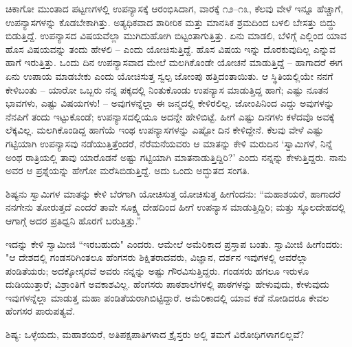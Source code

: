 ಚಿಕಾಗೋ ಮುಂತಾದ ಪಟ್ಟಣಗಳಲ್ಲಿ ಉಪನ್ಯಾಸಕ್ಕೆ ಆರಂಭಿಸಿದಾಗ, ವಾರಕ್ಕೆ ೧೨–೧೩, ಕೆಲವು ವೇಳೆ ಇನ್ನೂ ಹೆಚ್ಚಾಗೆ, ಉಪನ್ಯಾಸಗಳನ್ನು ಕೊಡಬೇಕಾಗಿತ್ತು. ಅತ್ಯಧಿಕವಾದ ಶಾರೀರಿಕ ಮತ್ತು ಮಾನಸಿಕ ಶ್ರಮದಿಂದ ಬಳಲಿ ಬೇಸತ್ತು ಬಿದ್ದು ಬಿಡುತ್ತಿದ್ದೆ. ಉಪನ್ಯಾಸದ ವಿಷಯವೆಲ್ಲಾ ಮುಗಿದುಹೋಗಿ ಬಿಟ್ಟಂತಾಗುತ್ತಿತ್ತು. ಏನು ಮಾಡಲಿ, ಬೆಳಿಗ್ಗೆ ಎಲ್ಲಿಂದ ಯಾವ ಹೊಸ ವಿಷಯವನ್ನು ತಂದು ಹೇಳಲಿ – ಎಂದು ಯೋಚಿಸುತ್ತಿದ್ದೆ. ಹೊಸ ವಿಷಯ ಇನ್ನು ದೊರಕುವುದಿಲ್ಲ ಎನ್ನುವ ಹಾಗೆ ಇರುತ್ತಿತ್ತು. ಒಂದು ದಿನ ಉಪನ್ಯಾಸವಾದ ಮೇಲೆ ಮಲಗಿಕೊಂಡೇ ಯೋಚನೆ ಮಾಡುತ್ತಿದ್ದೆ – ಹಾಗಾದರೆ ಈಗ ಏನು ಉಪಾಯ ಮಾಡಬೇಕು ಎಂದು ಯೋಚಿಸುತ್ತ ಸ್ವಲ್ಪ ಜೋಂಪು ಹತ್ತಿದಂತಾಯಿತು. ಆ ಸ್ಥಿತಿಯಲ್ಲಿಯೇ ನನಗೆ ಕೇಳಿಬಂತು – ಯಾರೋ ಒಬ್ಬರು ನನ್ನ ಪಕ್ಕದಲ್ಲಿ ನಿಂತುಕೊಂಡು ಉಪನ್ಯಾಸ ಮಾಡುತ್ತಿದ್ದ ಹಾಗೆ; ಎಷ್ಟು ನೂತನ ಭಾವಗಳು, ಎಷ್ಟು ವಿಷಯಗಳು! – ಅವುಗಳನ್ನೆಲ್ಲಾ ಈ ಜನ್ಮದಲ್ಲಿ ಕೇಳಿರಲಿಲ್ಲ. ಜೋಂಪಿನಿಂದ ಎದ್ದು ಅವುಗಳನ್ನು ನೆನಪಿಗೆ ತಂದು ಇಟ್ಟುಕೊಂಡೆ; ಉಪನ್ಯಾಸದಲ್ಲಿಯೂ ಅದನ್ನೇ ಹೇಳಿಬಿಟ್ಟೆ. ಹೀಗೆ ಎಷ್ಟು ದಿನಗಳು ಕಳೆದವೊ ಅವಕ್ಕೆ ಲೆಕ್ಕವಿಲ್ಲ. ಮಲಗಿಕೊಂಡಿದ್ದ ಹಾಗೆಯೆ ಇಂಥ ಉಪನ್ಯಾಸಗಳನ್ನು ಎಷ್ಟೋ ದಿನ ಕೇಳಿದ್ದೇನೆ. ಕೆಲವು ವೇಳೆ ಎಷ್ಟು ಗಟ್ಟಿಯಾಗಿ ಉಪನ್ಯಾಸವು ನಡೆಯುತ್ತಿತ್ತೆಂದರೆ, ನೆರೆಮನೆಯವರು ಆ ಮಾತನ್ನು ಕೇಳಿ ಮರುದಿನ ‘ಸ್ವಾಮಿಗಳೆ, ನಿನ್ನೆ ಅಂಥ ರಾತ್ರಿಯಲ್ಲಿ ತಾವು ಯಾರೊಡನೆ ಅಷ್ಟು ಗಟ್ಟಿಯಾಗಿ ಮಾತನಾಡುತ್ತಿದ್ದಿರಿ?’ ಎಂದು ನನ್ನನ್ನು ಕೇಳುತ್ತಿದ್ದರು. ನಾನು ಅವರ ಆ ಪ್ರಶ್ನೆಯನ್ನು ಹೇಗೋ ಮರೆಸಿಬಿಡುತ್ತಿದ್ದೆ. ಅದು ಒಂದು ಅದ್ಭುತದ ಸಂಗತಿ.

ಶಿಷ್ಯನು ಸ್ವಾಮಿಗಳ ಮಾತನ್ನು ಕೇಳಿ ಬೆರಗಾಗಿ ಯೋಚಿಸುತ್ತ ಯೋಚಿಸುತ್ತ ಹೀಗೆಂದನು: “ಮಹಾಶಯರೆ, ಹಾಗಾದರೆ ನನಗೇನು ತೋರುತ್ತದೆ ಎಂದರೆ ತಾವೇ ಸೂಕ್ಷ್ಮ ದೇಹದಿಂದ ಹೀಗೆ ಉಪನ್ಯಾಸ ಮಾಡುತ್ತಿದ್ದಿರಿ; ಮತ್ತು ಸ್ಥೂಲದೇಹದಲ್ಲಿ ಆಗಾಗ್ಗೆ ಅದರ ಪ್ರತಿಧ್ವನಿ ಹೊರಗೆ ಬರುತ್ತಿತ್ತು.”

ಇದನ್ನು ಕೇಳಿ ಸ್ವಾಮೀಜಿ “ಇರಬಹುದು" ಎಂದರು. ಆಮೇಲೆ ಅಮೆರಿಕಾದ ಪ್ರಸ್ತಾಪ ಬಂತು. ಸ್ವಾಮೀಜಿ ಹೀಗೆಂದರು: "ಆ ದೇಶದಲ್ಲಿ ಗಂಡಸರಿಗಿಂತಲೂ ಹೆಂಗಸರು ಶಿಕ್ಷಿತರಾದವರು, ವಿಜ್ಞಾನ, ದರ್ಶನ ಇವುಗಳಲ್ಲಿ ಅವರೆಲ್ಲಾ ಪಂಡಿತೆಯರು; ಅದಕ್ಕೋಸ್ಕರವೆ ಅವರು ನನ್ನನ್ನು ಅಷ್ಟು ಗೌರವಿಸುತ್ತಿದ್ದರು. ಗಂಡಸರು ಹಗಲೂ ಇರುಳೂ ದುಡಿಯುತ್ತಾರೆ; ವಿಶ್ರಾಂತಿಗೆ ಅವಕಾಶವಿಲ್ಲ. ಹೆಂಗಸರು ಪಾಠಶಾಲೆಗಳಲ್ಲಿ ಪಾಠಗಳನ್ನು ಹೇಳುವುದು, ಕೇಳುವುದು ಇವುಗಳನ್ನೆಲ್ಲಾ ಮಾಡುತ್ತ ಮಹಾ ಪಂಡಿತೆಯರಾಗಿಬಿಟ್ಟಿದ್ದಾರೆ. ಅಮೆರಿಕಾದಲ್ಲಿ ಯಾವ ಕಡೆ ನೋಡಿದರೂ ಕೇವಲ ಹೆಂಗಸರ ಪಾರುಪತ್ಯವೆ.

ಶಿಷ್ಯ: ಒಳ್ಳೆಯದು, ಮಹಾಶಯರೆ, ಅತಿಪಕ್ಷಪಾತಿಗಳಾದ ಕ್ರೈಸ್ತರು ಅಲ್ಲಿ ತಮಗೆ ವಿರೋಧಿಗಳಾಗಲಿಲ್ಲವೆ?

